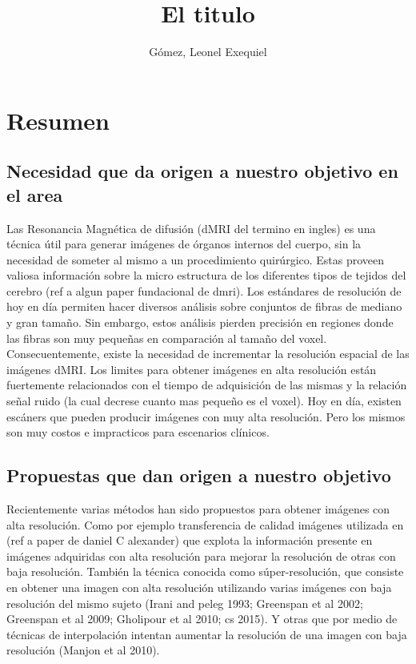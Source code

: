 \documentclass[a4paper,10pt]{article}
\title{El titulo}
\author{Gómez, Leonel Exequiel}
\begin{document}
\maketitle

\section{Resumen}

\subsection{Necesidad que da origen a nuestro objetivo en el area}
Las Resonancia Magnética de difusión (dMRI del termino en ingles) 
es una técnica útil para generar imágenes de órganos internos del cuerpo, sin 
la necesidad de someter al mismo a un procedimiento quirúrgico. Estas 
proveen valiosa información sobre la micro estructura de los diferentes 
tipos de tejidos del cerebro (ref a algun paper fundacional de dmri). Los 
estándares de resolución de hoy en día permiten hacer diversos análisis sobre 
conjuntos de fibras de mediano y gran tamaño. Sin embargo, estos análisis 
pierden precisión en regiones donde las fibras son muy pequeñas en comparación 
al tamaño del voxel. Consecuentemente, existe la necesidad de 
incrementar la resolución espacial de las imágenes dMRI. Los limites para 
obtener imágenes en alta resolución están fuertemente relacionados con el 
tiempo de adquisición de las mismas y la relación señal ruido (la cual decrese 
cuanto mas pequeño es el voxel). Hoy en día, existen escáners que pueden 
producir imágenes con muy alta resolución. Pero los mismos son muy costos e 
impracticos para escenarios clínicos.


\subsection{Propuestas que dan origen a nuestro objetivo}
Recientemente varias métodos han sido propuestos para obtener imágenes con 
alta resolución. Como por ejemplo transferencia de calidad imágenes utilizada 
en (ref a paper de daniel C alexander) que explota la información presente en 
imágenes adquiridas con alta resolución para mejorar la resolución de otras con 
baja resolución. También la técnica conocida como súper-resolución, que 
consiste en obtener una imagen con alta resolución utilizando varias 
imágenes con baja resolución del mismo sujeto (Irani and peleg 1993; 
Greenspan et al 2002; Greenspan et al 2009; Gholipour et al 2010; cs 2015). Y 
otras que por medio de técnicas de interpolación intentan aumentar la resolución 
de una imagen con baja resolución (Manjon et al 2010).
\end{document}
